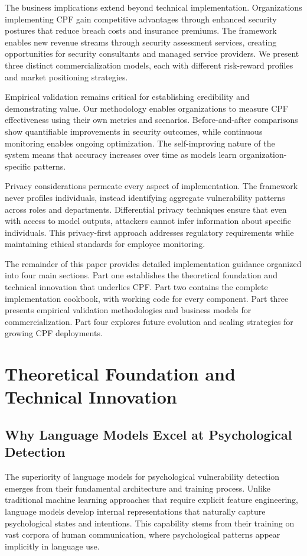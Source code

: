 \documentclass[11pt,a4paper]{article}
\begin{document}
The business implications extend beyond technical implementation. Organizations implementing CPF gain competitive advantages through enhanced security postures that reduce breach costs and insurance premiums. The framework enables new revenue streams through security assessment services, creating opportunities for security consultants and managed service providers. We present three distinct commercialization models, each with different risk-reward profiles and market positioning strategies.

Empirical validation remains critical for establishing credibility and demonstrating value. Our methodology enables organizations to measure CPF effectiveness using their own metrics and scenarios. Before-and-after comparisons show quantifiable improvements in security outcomes, while continuous monitoring enables ongoing optimization. The self-improving nature of the system means that accuracy increases over time as models learn organization-specific patterns.

Privacy considerations permeate every aspect of implementation. The framework never profiles individuals, instead identifying aggregate vulnerability patterns across roles and departments. Differential privacy techniques ensure that even with access to model outputs, attackers cannot infer information about specific individuals. This privacy-first approach addresses regulatory requirements while maintaining ethical standards for employee monitoring.

The remainder of this paper provides detailed implementation guidance organized into four main sections. Part one establishes the theoretical foundation and technical innovation that underlies CPF. Part two contains the complete implementation cookbook, with working code for every component. Part three presents empirical validation methodologies and business models for commercialization. Part four explores future evolution and scaling strategies for growing CPF deployments.

\section{Theoretical Foundation and Technical Innovation}

\subsection{Why Language Models Excel at Psychological Detection}

The superiority of language models for psychological vulnerability detection emerges from their fundamental architecture and training process. Unlike traditional machine learning approaches that require explicit feature engineering, language models develop internal representations that naturally capture psychological states and intentions. This capability stems from their training on vast corpora of human communication, where psychological patterns appear implicitly in language use.
\end{document}
